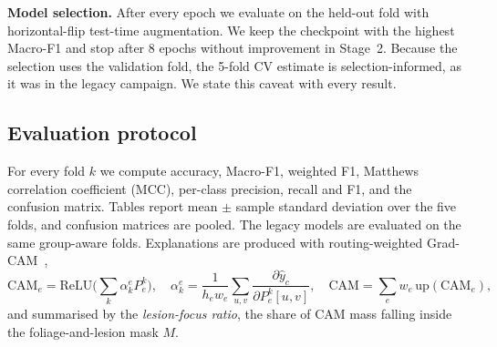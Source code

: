 \textbf{Model selection.} After every epoch we evaluate on the held-out fold
with horizontal-flip test-time augmentation. We keep the checkpoint with the
highest Macro-F1 and stop after 8 epochs without improvement in Stage~2. Because
the selection uses the validation fold, the 5-fold CV estimate is
selection-informed, as it was in the legacy campaign. We state this caveat with
every result.

\subsection{Evaluation protocol}
\label{sec:method_eval}

For every fold $k$ we compute accuracy, Macro-F1, weighted F1, Matthews
correlation coefficient (MCC), per-class precision, recall and F1, and the
confusion matrix. Tables report mean $\pm$ sample standard deviation over the five
folds, and confusion matrices are pooled. The legacy models are evaluated on the
same group-aware folds. Explanations are produced with routing-weighted
Grad-CAM~\cite{selvaraju2017gradcam},
\begin{equation}
\mathrm{CAM}_e = \mathrm{ReLU}\Big(\sum_k \alpha^e_k P_e^{k}\Big),\quad
\alpha^e_k = \frac{1}{h_e w_e}\sum_{u,v}\frac{\partial \hat{y}_c}{\partial P_e^{k}[u,v]},\quad
\mathrm{CAM} = \sum_e w_e\,\mathrm{up}(\mathrm{CAM}_e),
\end{equation}
and summarised by the \emph{lesion-focus ratio}, the share of CAM mass falling
inside the foliage-and-lesion mask $M$.
